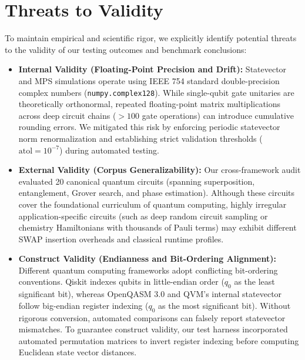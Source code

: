 \section{Threats to Validity}

To maintain empirical and scientific rigor, we explicitly identify potential threats to the validity of our testing outcomes and benchmark conclusions:

\begin{itemize}[leftmargin=*]
    \item \textbf{Internal Validity (Floating-Point Precision and Drift):} Statevector and MPS simulations operate using IEEE 754 standard double-precision complex numbers (\texttt{numpy.complex128}). While single-qubit gate unitaries are theoretically orthonormal, repeated floating-point matrix multiplications across deep circuit chains ($>100$ gate operations) can introduce cumulative rounding errors. We mitigated this risk by enforcing periodic statevector norm renormalization and establishing strict validation thresholds ($\text{atol} = 10^{-7}$) during automated testing.
    \item \textbf{External Validity (Corpus Generalizability):} Our cross-framework audit evaluated 20 canonical quantum circuits (spanning superposition, entanglement, Grover search, and phase estimation). Although these circuits cover the foundational curriculum of quantum computing, highly irregular application-specific circuits (such as deep random circuit sampling or chemistry Hamiltonians with thousands of Pauli terms) may exhibit different SWAP insertion overheads and classical runtime profiles.
    \item \textbf{Construct Validity (Endianness and Bit-Ordering Alignment):} Different quantum computing frameworks adopt conflicting bit-ordering conventions. Qiskit indexes qubits in little-endian order ($q_0$ as the least significant bit), whereas OpenQASM 3.0 and QVM's internal statevector follow big-endian register indexing ($q_0$ as the most significant bit). Without rigorous conversion, automated comparisons can falsely report statevector mismatches. To guarantee construct validity, our test harness incorporated automated permutation matrices to invert register indexing before computing Euclidean state vector distances.
\end{itemize}


